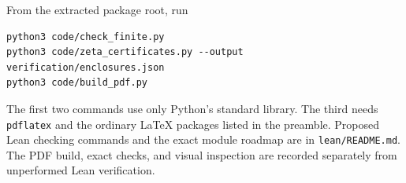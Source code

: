 From the extracted package root, run
\begin{verbatim}
python3 code/check_finite.py
python3 code/zeta_certificates.py --output verification/enclosures.json
python3 code/build_pdf.py
\end{verbatim}
The first two commands use only Python's standard library. The third
needs \texttt{pdflatex} and the ordinary LaTeX packages listed in the
preamble. Proposed Lean checking commands and the exact module roadmap
are in \texttt{lean/README.md}. The PDF build, exact checks, and visual
inspection are recorded separately from unperformed Lean verification.
